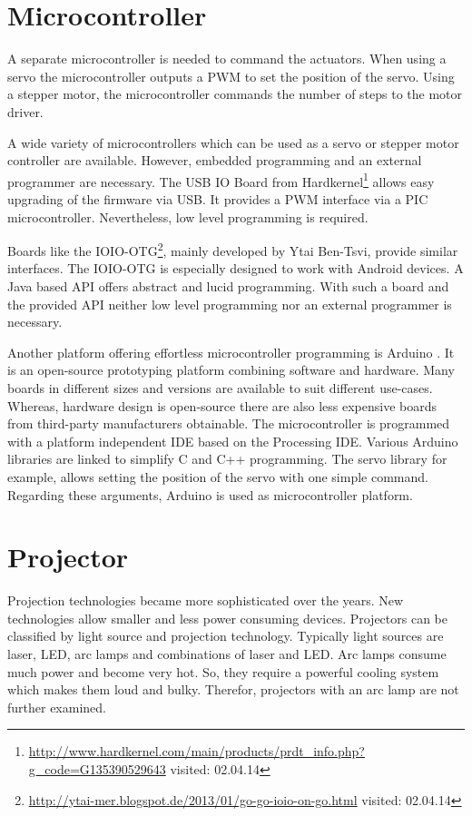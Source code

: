 \section{Microcontroller}
A separate microcontroller is needed to command the actuators. When using a servo the microcontroller outputs a \ac{PWM} to set the position of the servo. Using a stepper motor, the microcontroller commands the number of steps to the motor driver.  

A wide variety of microcontrollers which can be used as a servo or stepper motor controller are available. However, embedded programming and an external programmer are necessary. 
The USB IO Board from Hardkernel\footnote{\url{http://www.hardkernel.com/main/products/prdt_info.php?g_code=G135390529643} visited: 02.04.14} allows easy upgrading of the firmware via USB. It provides a PWM interface via a \ac{PIC} microcontroller. Nevertheless, low level programming is required. 

Boards like the IOIO-OTG\footnote{\url{http://ytai-mer.blogspot.de/2013/01/go-go-ioio-on-go.html} visited: 02.04.14}, mainly developed by Ytai Ben-Tsvi, provide similar interfaces. The IOIO-OTG is especially designed to work with Android devices. A Java based API offers abstract and lucid programming. With such a board and the provided API neither low level programming nor an external programmer is necessary. 

Another platform offering effortless microcontroller programming is Arduino \cite{Arduino:b6u8ceDY}. It is an open-source prototyping platform combining software and hardware. Many boards in different sizes and versions are available to suit different use-cases. Whereas, hardware design is open-source there are also less expensive boards from third-party manufacturers obtainable. The microcontroller is programmed with a platform independent IDE based on the Processing IDE. Various Arduino libraries are linked to simplify C and C++ programming. The servo library for example, allows setting the position of the servo with one simple command. Regarding these arguments, Arduino is used as microcontroller platform. 

\section{Projector}
Projection technologies became more sophisticated over the years. New technologies allow smaller and less power consuming devices. Projectors can be classified by light source and projection technology. Typically light sources are laser, LED, arc lamps and combinations of laser and LED. Arc lamps consume much power and become very hot. So, they require a powerful cooling system which makes them loud and bulky. Therefor, projectors with an arc lamp are not further examined.


